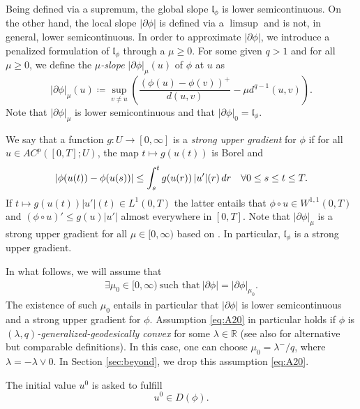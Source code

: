 \documentclass[10pt,a4paper]{amsart}
\newcommand{\Rz}{\mathbb{R}}
\newcommand{\dr}{{\rm d} r}
\renewcommand{\sl}{|\partial \phi|}
\newcommand{\gl}{\mathfrak{l}_\phi}
\newcommand{\md}{|u'|}
\begin{document}
 Being defined via a supremum, 
the global slope $\gl$ is lower semicontinuous.  On the other hand, the local slope $\sl$  is defined via a $\limsup$ and is not, in general, lower semicontinuous. In order to  approximate $\sl$, we  introduce  a penalized formulation of $\gl$ through a $\mu \geq 0$. For some given $q>1$ and for all $\mu \geq 0$, we define the {\it $\mu$-slope} $\sl_\mu(u)$ of $\phi$ at $u$ as 
\begin{equation}\label{eq:slmu}
\sl_\mu(u) \coloneqq \sup_{v\not = u}\left(\frac{(\phi(u) -
    \phi(v))^+}{d(u,v)} - \mu d^{q-1}(u,v) \right).  
\end{equation} 
Note that $\sl_\mu$ is lower semicontinuous \cite[Prop. 2.7]{rsss} and  that
$\sl_0 = \gl$.

We say that a function $g: U \to [0,\infty]$ is a {\it strong upper gradient} for $\phi$
\cite[Def.~1.2.1, p.~27]{Ambrosio08} if for all $u\in AC^p([0,T];U)$,
the map
$t \mapsto g(u(t))$ is Borel and 
$$|\phi(u(t)) - \phi(u(s))| \leq \int_s^t g (u(r))\,\md(r) \, \dr
\quad \forall 0\leq s \leq t \leq T.$$
If $t \mapsto g (u(t))\md(t) \in L^1(0,T) $ the
latter entails that $\phi \circ u  \in W^{1,1}(0,T) $ and $(\phi
\circ u)' \le g (u) \md$ almost everywhere in $[0,T]$.  Note that
 $\sl_\mu$  is a strong upper gradient for all $\mu \in [0,\infty)$ based on  \cite[proof of Corollary 2.4.10]{Ambrosio08}. In
particular, 
$\gl$ is a strong upper gradient.

In what follows, we will assume that
\begin{align}
    \exists
  \mu_0 \in [0,\infty) \ \text{such that} \ \sl=\sl_{\mu_0}. \label{eq:A20}
\end{align}
 The existence of such $\mu_0$ entails in particular that $\sl$
is lower semicontinuous and a strong upper gradient for $\phi$. Assumption
\eqref{eq:A20} in particular holds if $\phi$ is {\it
  $(\lambda,q)$-generalized-geodesically convex} for some $\lambda \in
\Rz$  \cite{rsss}  (see also \cite{Ohta-Zhao,Shimoyama} for
alternative but comparable definitions).  In this case, one can choose   $\mu_0 = \lambda^-/q$, where
$\lambda = -\lambda \vee 0$. In Section \ref{sec:beyond}, we drop this assumption \eqref{eq:A20}. 

The initial value $u^0$ is asked to fulfill
\begin{equation}
  u^0\in D(\phi).\label{eq:A3}  
\end{equation}
\end{document}
